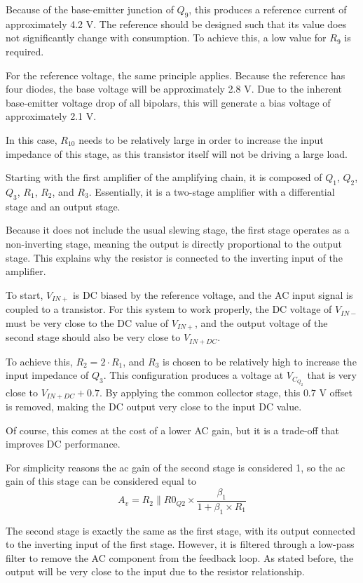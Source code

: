 \documentclass[12pt]{article}
\begin{document}
Because of the base-emitter junction of $Q_9$, this produces a reference current of approximately 4.2 V. The reference should be designed such that its value does not significantly change with consumption. To achieve this, a low value for $R_9$ is required.

For the reference voltage, the same principle applies. Because the reference has four diodes, the base voltage will be approximately 2.8 V. Due to the inherent base-emitter voltage drop of all bipolars, this will generate a bias voltage of approximately 2.1 V.  

In this case, $R_{10}$ needs to be relatively large in order to increase the input impedance of this stage, as this transistor itself will not be driving a large load.

Starting with the first amplifier of the amplifying chain, it is composed of $Q_1$, $Q_2$, $Q_3$, $R_1$, $R_2$, and $R_3$. Essentially, it is a two-stage amplifier with a differential stage and an output stage.  

Because it does not include the usual slewing stage, the first stage operates as a non-inverting stage, meaning the output is directly proportional to the output stage. This explains why the resistor is connected to the inverting input of the amplifier.



To start, $V_{IN+}$ is DC biased by the reference voltage, and the AC input signal is coupled to a transistor. For this system to work properly, the DC voltage of $V_{IN-}$ must be very close to the DC value of $V_{IN+}$, and the output voltage of the second stage should also be very close to $V_{IN+DC}$.  

To achieve this, $R_2 = 2 \cdot R_1$, and $R_3$ is chosen to be relatively high to increase the input impedance of $Q_3$. This configuration produces a voltage at $V_{C_{Q_2}}$ that is very close to $V_{IN+DC} + 0.7$. By applying the common collector stage, this $0.7$ V offset is removed, making the DC output very close to the input DC value.  

Of course, this comes at the cost of a lower AC gain, but it is a trade-off that improves DC performance.

For simplicity reasons the ac gain of the second stage is considered 1, so the ac gain of this stage can be considered equal to
\[
    A_v = R_2 \parallel R0_{Q2} \times \frac{\beta_1}{1 + \beta_1\times R_1}
 \]


The second stage is exactly the same as the first stage, with its output connected to the inverting input of the first stage. However, it is filtered through a low-pass filter to remove the AC component from the feedback loop. As stated before, the output will be very close to the input due to the resistor relationship. 
\end{document}
